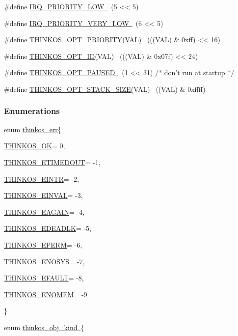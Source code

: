 {{\#define
}{\protect\hyperlink{h.1302m92}{IRQ\_PRIORITY\_LOW}}{\protect\hyperlink{h.1302m92}{~}}{~(5
\textless{}\textless{} 5)}

{\#define
}{\protect\hyperlink{h.3mzq4wv}{IRQ\_PRIORITY\_VERY\_LOW}}{\protect\hyperlink{h.3mzq4wv}{~}}{~(6
\textless{}\textless{} 5)}

{\#define
}{\protect\hyperlink{h.2250f4o}{THINKOS\_OPT\_PRIORITY}}{\protect\hyperlink{h.2250f4o}{(}}{VAL)~
(((VAL) \& 0xff) \textless{}\textless{} 16)}

{\#define
}{\protect\hyperlink{h.haapch}{THINKOS\_OPT\_ID}}{\protect\hyperlink{h.haapch}{(}}{VAL)~
(((VAL) \& 0x07f) \textless{}\textless{} 24)}

{\#define
}{\protect\hyperlink{h.319y80a}{THINKOS\_OPT\_PAUSED}}{\protect\hyperlink{h.319y80a}{~}}{~(1
\textless{}\textless{} 31) /* don't run at startup */}

{\#define
}{\protect\hyperlink{h.1gf8i83}{THINKOS\_OPT\_STACK\_SIZE}}{\protect\hyperlink{h.1gf8i83}{(}}{VAL)~
((VAL) \& 0xffff)}

\subsubsection{\texorpdfstring{{Enumerations}}{Enumerations}}\label{enumerations}

{enum }{\protect\hyperlink{h.40ew0vw}{thinkos\_err}}{\{ }

{\protect\hyperlink{h.2fk6b3p}{THINKOS\_OK}}{= 0, }

{\protect\hyperlink{h.upglbi}{THINKOS\_ETIMEDOUT}}{= -1, }

{\protect\hyperlink{h.3ep43zb}{THINKOS\_EINTR}}{= -2, }

{\protect\hyperlink{h.1tuee74}{THINKOS\_EINVAL}}{= -3, }

{\protect\hyperlink{h.4du1wux}{THINKOS\_EAGAIN}}{= -4, }

{\protect\hyperlink{h.2szc72q}{THINKOS\_EDEADLK}}{= -5, }

{\protect\hyperlink{h.184mhaj}{THINKOS\_EPERM}}{= -6, }

{\protect\hyperlink{h.3s49zyc}{THINKOS\_ENOSYS}}{= -7, }

{\protect\hyperlink{h.279ka65}{THINKOS\_EFAULT}}{= -8, }

{\protect\hyperlink{h.meukdy}{THINKOS\_ENOMEM}}{= -9 }

{\}}

{enum
}{\protect\hyperlink{h.36ei31r}{thinkos\_obj\_kind}}{\protect\hyperlink{h.36ei31r}{~}}{\{
}

}

